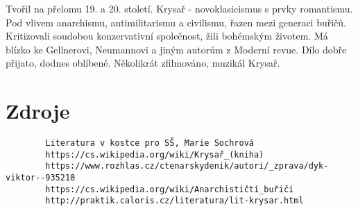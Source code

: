 \documentclass[11pt]{article}
\begin{document}
    Tvořil na přelomu 19. a 20. století.
    Krysař - novoklasicismus s prvky romantismu.
    Pod vlivem anarchismu, antimilitarismu a civilismu, řazen mezi generaci buřičů.
    Kritizovali soudobou konzervativní společnost, žili bohémským životem.
    Má blízko ke Gellnerovi, Neumannovi a jiným autorům z Moderní revue.
    Dílo dobře přijato, dodnes oblíbené.
    Několikrát zfilmováno, muzikál Krysař.
    \section*{Zdroje}
    \begin{verbatim}
        Literatura v kostce pro SŠ, Marie Sochrová
        https://cs.wikipedia.org/wiki/Krysař_(kniha)
        https://www.rozhlas.cz/ctenarskydenik/autori/_zprava/dyk-viktor--935210
        https://cs.wikipedia.org/wiki/Anarchističtí_buřiči
        http://praktik.caloris.cz/literatura/lit-krysar.html
    \end{verbatim}
    
\end{document}
